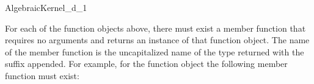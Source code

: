 \begin{ccRefConcept}{AlgebraicKernel_d_1}
\ccOperations

For each of the function objects above, there must exist a member function that requires no arguments and returns an instance of that function object. The name of the member function is the uncapitalized name of the type returned with the suffix  appended. For example, for the function object   the following member function must exist:


\ccSeeAlso
{}\\

\end{ccRefConcept}
